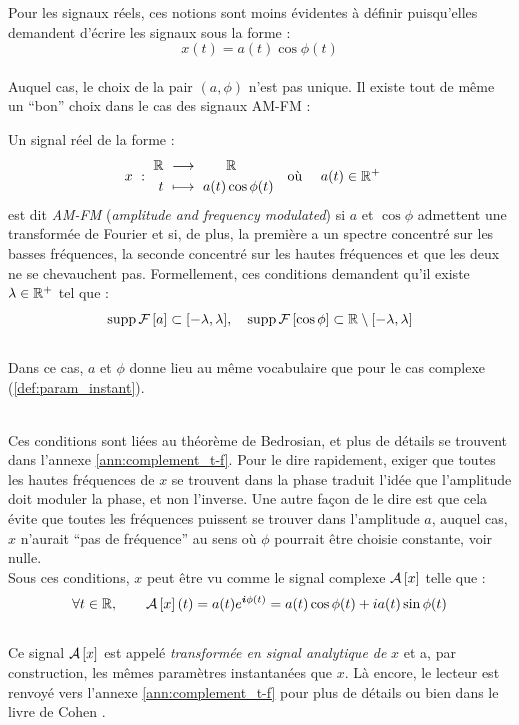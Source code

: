 Pour les signaux réels, ces notions sont moins évidentes à définir puisqu'elles demandent d'écrire les signaux sous la forme :
\[x(t) = a(t) \cos\phi(t)\]
\\
Auquel cas, le choix de la pair $(a,\phi)$ n'est pas unique. Il existe tout de même un ``bon'' choix dans le cas des signaux AM-FM :
\begin{definition}[Signal AM-FM]
	Un signal réel de la forme :
	\begin{align}
		x\ &:\ \begin{aligned}\mathbb{R}\ &\longrightarrow\qquad \mathbb{R} \\
			t\ &\longmapsto\ a(t) \cos\phi(t)
		\end{aligned}  &  \text{où }\quad a(t)\in\mathbb{R}^+\quad
	\end{align}
	est dit \emph{AM-FM} (\emph{amplitude and frequency modulated}) si $a$ et $\cos\phi$ admettent une transformée de Fourier et si, de plus, la première a un spectre concentré sur les basses fréquences, la seconde concentré sur les hautes fréquences et que les deux ne se chevauchent pas.
	Formellement, ces conditions demandent qu'il existe $\lambda\in\mathbb{R}^+$ tel que :
	\begin{equation}\label{eq:condi_AM-FM}
		\text{\normalfont supp}\, \mathcal{F}\left[a\right] \subset [-\lambda, \lambda],\quad \text{\normalfont supp}\, \mathcal{F}\left[\cos\phi\right] \subset \mathbb{R}\setminus[-\lambda,\lambda]
	\end{equation}
	\\
	Dans ce cas, $a$ et $\phi$ donne lieu au même vocabulaire que pour le cas complexe (\cref{def:param_instant}).
\end{definition}
\skipl
\\
Ces conditions sont liées au théorème de Bedrosian, et plus de détails se trouvent dans l'annexe \ref{ann:complement_t-f}. Pour le dire rapidement, exiger que toutes les hautes fréquences de $x$ se trouvent dans la phase traduit l'idée que l'amplitude doit moduler la phase, et non l'inverse. Une autre façon de le dire est que cela évite que toutes les fréquences puissent se trouver dans l'amplitude $a$, auquel cas, $x$ n'aurait ``pas de fréquence'' au sens où $\phi$ pourrait être choisie constante, voir nulle.
\\
Sous ces conditions, $x$ peut être vu comme le signal complexe $\mathcal{A}\left[x\right]$ telle que :
\begin{equation}
	\forall t\in\mathbb{R},\qquad \mathcal{A}\left[x\right](t) = a(t) e^{\boldsymbol{i} \phi(t)}= a(t)\cos\phi(t) + ia(t)\sin\phi(t)
\end{equation}
\\
Ce signal $\mathcal{A}\left[x\right]$ est appelé \emph{transformée en signal analytique de} $x$ et a, par construction, les mêmes paramètres instantanées que $x$.
Là encore, le lecteur est renvoyé vers l'annexe \ref{ann:complement_t-f} pour plus de détails ou bien dans le livre de Cohen \cite{cohen_time_1995}.
\\

